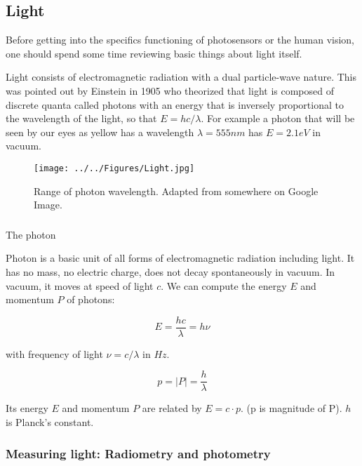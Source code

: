 \subsection{Light}

Before getting into the specifics functioning of photosensors or the human vision, one should spend some time reviewing basic things about light itself. 

Light consists of electromagnetic radiation with a dual particle-wave nature. This was pointed out by Einstein in 1905 who theorized that light is composed of discrete quanta called photons with an energy that is inversely proportional to the wavelength of the light, so that $E=hc/\lambda$.
For example a photon that will be seen by our eyes as yellow has a wavelength $\lambda=555nm$ has $E=2.1eV$ in vacuum.

\begin{figure}[H]
    \centering
    \texttt{[image: ../../Figures/Light.jpg]}
    \caption{Range of photon wavelength. Adapted from somewhere on Google Image.}
    \label{fig:Light}
\end{figure}

\subsubsection{}{The photon}

Photon is a basic unit of all forms of electromagnetic radiation including light. It has no mass, no electric charge, does not decay spontaneously in vacuum. In vacuum, it moves at speed of light $c$. We can compute the energy $E$ and momentum $P$ of photons: 

\begin{equation}
    E = \frac{h c}{\lambda} = h \nu 
\end{equation}

with frequency of light $\nu = c/\lambda$ in $Hz$.

\begin{equation}
    p = |P| = \frac{h}{\lambda}
\end{equation}

Its energy $E$ and momentum $P$ are related by $E=c\cdot p$. (p is magnitude of P). $h$ is Planck's constant. 

\subsubsection{Measuring light: Radiometry and photometry}

